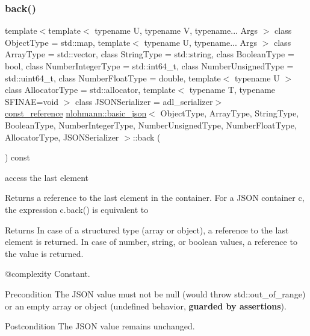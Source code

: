 \subsubsection{\texorpdfstring{back()}{back()}\hspace{0.1cm}{\footnotesize\ttfamily [2/2]}}
{\footnotesize\ttfamily template$<$template$<$ typename U, typename V, typename... Args $>$ class Object\+Type = std\+::map, template$<$ typename U, typename... Args $>$ class Array\+Type = std\+::vector, class String\+Type  = std\+::string, class Boolean\+Type  = bool, class Number\+Integer\+Type  = std\+::int64\+\_\+t, class Number\+Unsigned\+Type  = std\+::uint64\+\_\+t, class Number\+Float\+Type  = double, template$<$ typename U $>$ class Allocator\+Type = std\+::allocator, template$<$ typename T, typename S\+F\+I\+N\+A\+E=void $>$ class J\+S\+O\+N\+Serializer = adl\+\_\+serializer$>$ \\
\mbox{\hyperlink{classnlohmann_1_1basic__json_a4057c5425f4faacfe39a8046871786ca}{const\+\_\+reference}} \mbox{\hyperlink{classnlohmann_1_1basic__json}{nlohmann\+::basic\+\_\+json}}$<$ Object\+Type, Array\+Type, String\+Type, Boolean\+Type, Number\+Integer\+Type, Number\+Unsigned\+Type, Number\+Float\+Type, Allocator\+Type, J\+S\+O\+N\+Serializer $>$\+::back (\begin{DoxyParamCaption}{ }\end{DoxyParamCaption}) const\hspace{0.3cm}{\ttfamily [inline]}}



access the last element 

Returns a reference to the last element in the container. For a J\+S\+ON container {\ttfamily c}, the expression {\ttfamily c.\+back()} is equivalent to 
\begin{DoxyCode}{0}
\end{DoxyCode}


\begin{DoxyReturn}{Returns}
In case of a structured type (array or object), a reference to the last element is returned. In case of number, string, or boolean values, a reference to the value is returned.
\end{DoxyReturn}
@complexity Constant.

\begin{DoxyPrecond}{Precondition}
The J\+S\+ON value must not be {\ttfamily null} (would throw {\ttfamily std\+::out\+\_\+of\+\_\+range}) or an empty array or object (undefined behavior, {\bfseries{guarded by assertions}}). 
\end{DoxyPrecond}
\begin{DoxyPostcond}{Postcondition}
The J\+S\+ON value remains unchanged.
\end{DoxyPostcond}

